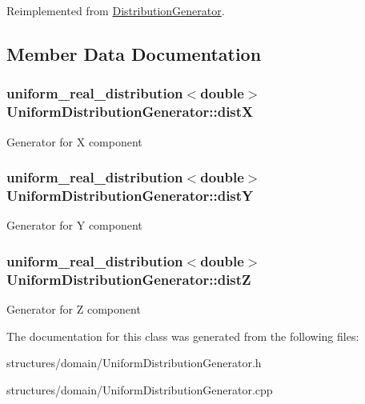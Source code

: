 Reimplemented from \hyperlink{class_distribution_generator_ae4fa2d599942539e4b1971b0a8d5f8ba}{Distribution\+Generator}.



\subsection{Member Data Documentation}
\subsubsection[{\texorpdfstring{distX}{distX}}]{\setlength{\rightskip}{0pt plus 5cm}uniform\+\_\+real\+\_\+distribution$<$double$>$ Uniform\+Distribution\+Generator\+::distX\hspace{0.3cm}{\ttfamily [private]}}\hypertarget{class_uniform_distribution_generator_a1e5c1a311993315dd08d2ef17e74e84d}{}\label{class_uniform_distribution_generator_a1e5c1a311993315dd08d2ef17e74e84d}
Generator for X component 
\subsubsection[{\texorpdfstring{distY}{distY}}]{\setlength{\rightskip}{0pt plus 5cm}uniform\+\_\+real\+\_\+distribution$<$double$>$ Uniform\+Distribution\+Generator\+::distY\hspace{0.3cm}{\ttfamily [private]}}\hypertarget{class_uniform_distribution_generator_ada3c6906156a827e079a8085546a27c8}{}\label{class_uniform_distribution_generator_ada3c6906156a827e079a8085546a27c8}
Generator for Y component 
\subsubsection[{\texorpdfstring{distZ}{distZ}}]{\setlength{\rightskip}{0pt plus 5cm}uniform\+\_\+real\+\_\+distribution$<$double$>$ Uniform\+Distribution\+Generator\+::distZ\hspace{0.3cm}{\ttfamily [private]}}\hypertarget{class_uniform_distribution_generator_ad5b89c08f50e76a4827af2e6eb9c5df8}{}\label{class_uniform_distribution_generator_ad5b89c08f50e76a4827af2e6eb9c5df8}
Generator for Z component 

The documentation for this class was generated from the following files\+:\begin{DoxyCompactItemize}
\item 
structures/domain/Uniform\+Distribution\+Generator.\+h\item 
structures/domain/Uniform\+Distribution\+Generator.\+cpp\end{DoxyCompactItemize}
